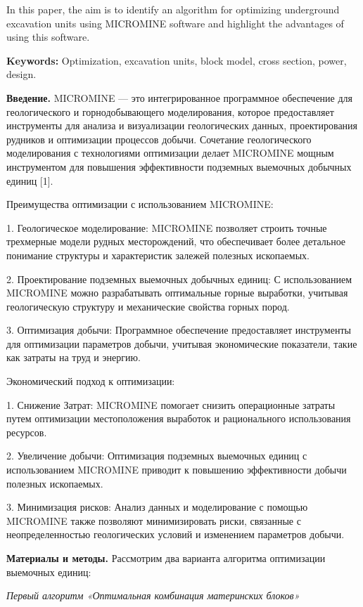 In this paper, the aim is to identify an algorithm for optimizing
underground excavation units using MICROMINE software and highlight the
advantages of using this software.

{\bfseries Keywords:} Optimization, excavation units, block model, cross
section, power, design.

\begin{multicols}{2}
{\bfseries Введение.} MICROMINE --- это интегрированное программное
обеспечение для геологического и горнодобывающего моделирования, которое
предоставляет инструменты для анализа и визуализации геологических
данных, проектирования рудников и оптимизации процессов добычи.
Сочетание геологического моделирования с технологиями оптимизации делает
MICROMINE мощным инструментом для повышения эффективности подземных
выемочных добычных единиц {[}1{]}.

Преимущества оптимизации с использованием MICROMINE:

1. Геологическое моделирование: MICROMINE позволяет строить точные
трехмерные модели рудных месторождений, что обеспечивает более детальное
понимание структуры и характеристик залежей полезных ископаемых.

2. Проектирование подземных выемочных добычных единиц: С использованием
MICROMINE можно разрабатывать оптимальные горные выработки, учитывая
геологическую структуру и механические свойства горных пород.

3. Оптимизация добычи: Программное обеспечение предоставляет инструменты
для оптимизации параметров добычи, учитывая экономические показатели,
такие как затраты на труд и энергию.

Экономический подход к оптимизации:

1. Снижение Затрат: MICROMINE помогает снизить операционные затраты
путем оптимизации местоположения выработок и рационального использования
ресурсов.

2. Увеличение добычи: Оптимизация подземных выемочных единиц с
использованием MICROMINE приводит к повышению эффективности добычи
полезных ископаемых.

3. Минимизация рисков: Анализ данных и моделирование с помощью MICROMINE
также позволяют минимизировать риски, связанные с неопределенностью
геологических условий и изменением параметров добычи.

{\bfseries Материалы и методы.} Рассмотрим два варианта алгоритма
оптимизации выемочных единиц:

\emph{Первый алгоритм «Оптимальная комбинация материнских блоков»}


\end{multicols}
